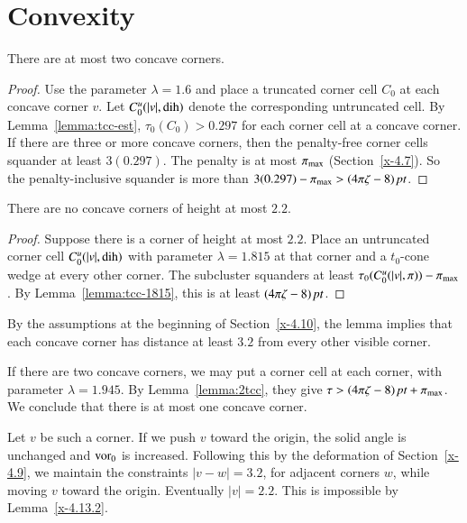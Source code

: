 \section{Convexity} %

\begin{lemma}
There are at most two concave corners.
\end{lemma}

\begin{proof}
Use the parameter $\lambda=1.6$ and place a truncated corner cell $C_0$
at each concave corner $v$. Let $C_0^u(|v|,\operatorname{dih})$ denote the
corresponding untruncated cell.  By Lemma~\ref{lemma:tcc-est},
$\tau_0(C_0) > 0.297$ for each corner cell at a concave corner.
If there are three or more concave corners, then the penalty-free corner
cells squander at least $3(0.297)$. The penalty is at most $\pi_{\max}$
(Section~\ref{x-4.7}). So the penalty-inclusive squander is more than
    $3(0.297) - \pi_{\max} >(4\pi\zeta-8)\,\hbox{\it pt}$.
\end{proof}

\begin{lemma}
There are no concave corners of height at most $2.2$.
\end{lemma}

\begin{proof}
Suppose there is a corner of height at most $2.2$. Place an
untruncated corner cell $C^u_0(|v|,\operatorname{dih})$ with parameter $\lambda
=1.815$ at that corner and a $t_0$-cone wedge at every other corner. 
The
subcluster squanders at least
    $\tau_0(C^u_0(|v|,\pi))-\pi_{\max}$.
By Lemma~\ref{lemma:tcc-1815}, this is at least $(4\pi\zeta-8)\,\hbox{\it pt}$.
\end{proof}

By the assumptions at the beginning of Section~\ref{x-4.10}, the lemma
implies that each concave corner has distance at least $3.2$ from every
other visible corner.

If there are two concave corners, we may put a corner cell at
each corner, with parameter $\lambda=1.945$.  By Lemma~\ref{lemma:2tcc},
they give $\tau > (4\pi\zeta-8)\,\hbox{\it pt} + \pi_{\max}$.
We conclude that there is at most one concave corner. 

Let $v$ be such a
corner.  
If we push $v$ toward the origin, the solid angle is unchanged
and $\operatorname{vor}_0$ is increased.  Following this by the deformation of
Section~\ref{x-4.9}, we maintain the constraints $|v-w|=3.2$, for
adjacent corners $w$, while moving $v$ toward the origin. Eventually
$|v|=2.2$. This is impossible by Lemma~\ref{x-4.13.2}.

